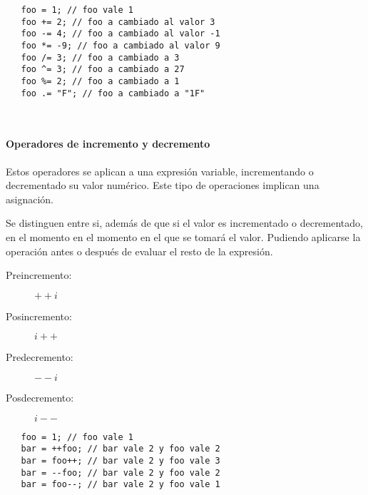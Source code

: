  \begin{lstlisting}
   foo = 1; // foo vale 1
   foo += 2; // foo a cambiado al valor 3
   foo -= 4; // foo a cambiado al valor -1
   foo *= -9; // foo a cambiado al valor 9
   foo /= 3; // foo a cambiado a 3
   foo ^= 3; // foo a cambiado a 27
   foo %= 2; // foo a cambiado a 1
   foo .= "F"; // foo a cambiado a "1F" 
\end{lstlisting} 
\hfill\\


\paragraph{Operadores de incremento y decremento} \label{sec:op_inc}
Estos operadores se aplican a una expresión variable, incrementando o decrementado su valor
numérico. Este tipo de operaciones implican una asignación. 

Se distinguen entre si, además de que si el valor es incrementado o decrementado, en el momento en el momento
en el que se tomará el valor. Pudiendo aplicarse la operación antes o después de evaluar el resto de la expresión.

\begin{description}
\item [Preincremento:] $++i$
\item [Posincremento:] $i++$
\item [Predecremento:] $--i$
\item [Posdecremento:] $i--$
\end{description} 


 \begin{lstlisting}
   foo = 1; // foo vale 1
   bar = ++foo; // bar vale 2 y foo vale 2
   bar = foo++; // bar vale 2 y foo vale 3
   bar = --foo; // bar vale 2 y foo vale 2
   bar = foo--; // bar vale 2 y foo vale 1
\end{lstlisting} 
\hfill\\


